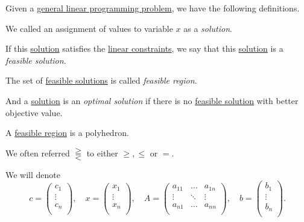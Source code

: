 Given a \hyperref[def:general-linear-programming-problem]{general linear programming problem}, we have the following definitions.
\begin{definition}[Solution]\label{def:solution}
	We called an assignment of values to variable \(x\) as a \emph{solution}.

	\begin{definition}\label{def:feasible-solution}
		If this \hyperref[def:solution]{solution} satisfies the \hyperref[def:constraints]{linear constraints}, we say that
		this \hyperref[def:solution]{solution} is a \emph{feasible solution}.
	\end{definition}

	\begin{definition}\label{def:feasible-region}
		The set of \hyperref[def:feasible-solution]{feasible solutions} is called \emph{feasible region}.
	\end{definition}

	\begin{definition}\label{def:optimal-solution}
		And a \hyperref[def:solution]{solution} is an \emph{optimal solution} if there is no \hyperref[def:feasible-solution]{feasible solution}
		with better objective value.
	\end{definition}
\end{definition}

\begin{remark}
	A \hyperref[def:feasible-region]{feasible region} is a polyhedron.
\end{remark}

\begin{notation}
	We often referred \(\gtreqqless \) to either \(\geq , \leq\) or \(=\).
\end{notation}

We will denote
\[
	c= \begin{pmatrix}
		c_1    \\
		\vdots \\
		c_n    \\
	\end{pmatrix},\quad
	x = \begin{pmatrix}
		x_1    \\
		\vdots \\
		x_n    \\
	\end{pmatrix}, \quad
	A = \begin{pmatrix}
		a_{11} & \ldots & a_{1n} \\
		\vdots & \ddots & \vdots \\
		a_{n1} & \ldots & a_{nn} \\
	\end{pmatrix},\quad
	b = \begin{pmatrix}
		b_1    \\
		\vdots \\
		b_n    \\
	\end{pmatrix}.
\]

